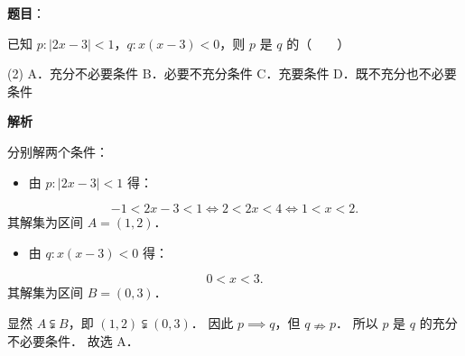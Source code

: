 \begin{answer}

\textbf{题目}：

已知 $p: |2x - 3| < 1$，$q: x(x - 3) < 0$，则 $p$ 是 $q$ 的\mbox{（　　）}

\begin{gkopts}(2)
\task A．充分不必要条件
\task B．必要不充分条件
\task C．充要条件
\task D．既不充分也不必要条件
\end{gkopts}

\textbf{解析}

分别解两个条件：
\begin{itemize}
\item 由 $p: |2x - 3| < 1$ 得：
\end{itemize}
\nopagebreak[4]
\[
-1 < 2x - 3 < 1 \iff 2 < 2x < 4 \iff 1 < x < 2.
\]
其解集为区间 $A = (1, 2)$．
\begin{itemize}
\item 由 $q: x(x - 3) < 0$ 得：
\end{itemize}
\nopagebreak[4]
\[
0 < x < 3.
\]
其解集为区间 $B = (0, 3)$．

显然 $A \subsetneqq B$，即 $(1, 2) \subsetneqq (0, 3)$．
因此 $p \implies q$，但 $q \nRightarrow p$．
所以 $p$ 是 $q$ 的充分不必要条件．
故选 A．


\end{answer}
